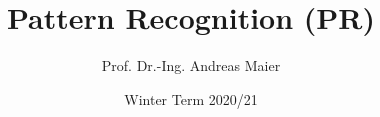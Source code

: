 \ifpdf
  \def\jpg{jpg} \def\jpgdir{./jpg}
  \def\png{png} \def\pngdir{./png}
  \def\texfig{pdf} \def\texfigdir{./texfig_c}
  \def\ps{pdf}  \def\psdir{./eps_c}
\else
  \def\jpg{eps} \def\jpgdir{./jpg_c}
  \def\png{eps} \def\pngdir{./png_c}
  \def\texfig{pstex} \def\texfigdir{./texfig_c}
   \def\ps{eps}  \def\psdir{./eps}
\fi



\makeatletter
\renewcommand{\CRB@setcopyrightfont}{\tiny \color{black!33}}
\def\beamer@calltheme#1#2#3{\def\beamer@themelist{#2}
	\@for\beamer@themename:=\beamer@themelist\do
	{\usepackage[{#1}]{\beamer@themelocation/#3\beamer@themename}}}
\def\usefolder#1{\def\beamer@themelocation{#1}}
\def\beamer@themelocation{}
\usefolder{theme}





   



\title[Lecture \emph{Pattern Recognition}]{Pattern Recognition (PR)}
\date{Winter Term 2020/21}


\author[\symb{227}~2005--2020 Hornegger, Hahn, Steidl, Nöth, Maier]{Prof. Dr.-Ing. Andreas Maier}

